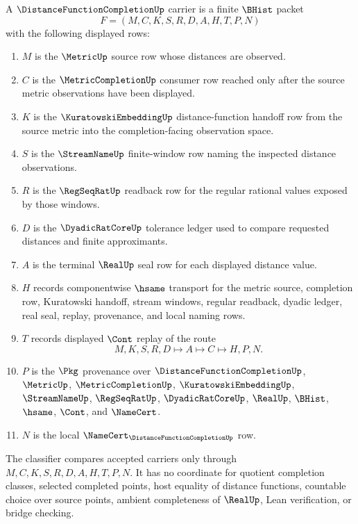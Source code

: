 \begin{definition}
\label{def:distance-function-completion-carrier}
A $\DistanceFunctionCompletionUp$ carrier is a finite $\BHist$ packet
$$
F=(M,C,K,S,R,D,A,H,T,P,N)
$$
with the following displayed rows:
\begin{enumerate}
\item $M$ is the $\MetricUp$ source row whose distances are observed.
\item $C$ is the $\MetricCompletionUp$ consumer row reached only after the source metric observations have been displayed.
\item $K$ is the $\KuratowskiEmbeddingUp$ distance-function handoff row from the source metric into the completion-facing observation space.
\item $S$ is the $\StreamNameUp$ finite-window row naming the inspected distance observations.
\item $R$ is the $\RegSeqRatUp$ readback row for the regular rational values exposed by those windows.
\item $D$ is the $\DyadicRatCoreUp$ tolerance ledger used to compare requested distances and finite approximants.
\item $A$ is the terminal $\RealUp$ seal row for each displayed distance value.
\item $H$ records componentwise $\hsame$ transport for the metric source, completion row, Kuratowski handoff, stream windows, regular readback, dyadic ledger, real seal, replay, provenance, and local naming rows.
\item $T$ records displayed $\Cont$ replay of the route
$$
M,K,S,R,D \longmapsto A \longmapsto C \longmapsto H,P,N .
$$
\item $P$ is the $\Pkg$ provenance over $\DistanceFunctionCompletionUp$, $\MetricUp$, $\MetricCompletionUp$, $\KuratowskiEmbeddingUp$, $\StreamNameUp$, $\RegSeqRatUp$, $\DyadicRatCoreUp$, $\RealUp$, $\BHist$, $\hsame$, $\Cont$, and $\NameCert$.
\item $N$ is the local $\NameCert_{\DistanceFunctionCompletionUp}$ row.
\end{enumerate}
The classifier compares accepted carriers only through $M,C,K,S,R,D,A,H,T,P,N$. It has no coordinate for quotient completion classes, selected completed points, host equality of distance functions, countable choice over source points, ambient completeness of $\RealUp$, Lean verification, or bridge checking.
\end{definition}

